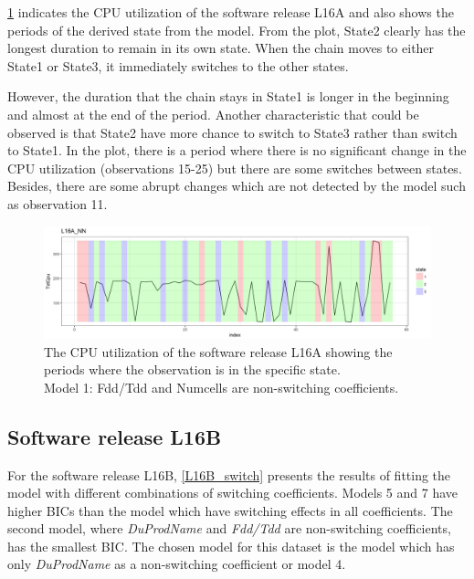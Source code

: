 \ref{L16A_NN} indicates the CPU utilization of the software release
L16A and also shows the periods of the derived state from the model.
From the plot, State2 clearly has the longest duration to remain in
its own state. When the chain moves to either State1 or State3, it
immediately switches to the other states.%

{} However, the duration that the chain stays in State1 is longer in
the beginning and almost at the end of the period. Another characteristic
that could be observed is that State2 have more chance to switch to
State3 rather than switch to State1. In the plot, there is a period
where there is no significant change in the CPU utilization (observations
15-25) but there are some switches between states. Besides, there
are some abrupt changes which are not detected by the model such as
observation 11. 

\begin{figure}[H]
\centering{}\includegraphics[scale=0.35]{picture/L16A_NN1}\caption{The CPU utilization of the software release L16A showing the periods
where the observation is in the specific state. \protect \\
Model 1: Fdd/Tdd and Numcells are non-switching coefficients.}
\label{L16A_NN}
\end{figure}


\subsection{Software release L16B}

For the software release L16B, \ref{L16B_switch} presents the results
of fitting the model with different combinations of switching coefficients.
Models 5 and 7 have higher BICs than the model which have switching
effects in all coefficients. The second model, where \emph{DuProdName}
and \emph{Fdd/Tdd} are non-switching coefficients, has the smallest
BIC. The chosen model for this dataset is the model which has only
\emph{DuProdName} as a non-switching coefficient or model 4.

